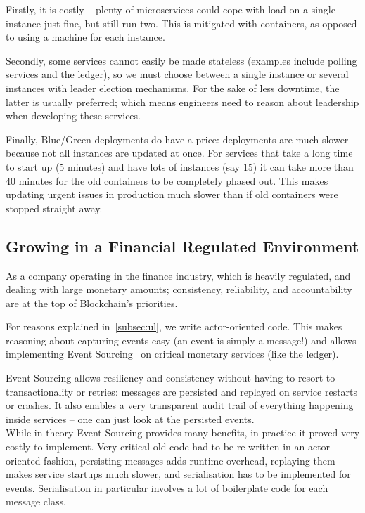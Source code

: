 \documentclass[conference]{IEEEtran}
\begin{document}
    Firstly, it is costly -- plenty of microservices could cope with load on a single instance just
    fine, but still run two.
    This is mitigated with containers, as opposed to using a machine for each
    instance.

    Secondly, some services cannot easily be made stateless (examples include polling services
    and the ledger), so we must choose between a single instance or several instances with leader
    election mechanisms.
    For the sake of less downtime, the latter is usually preferred;
    which means engineers need to reason about leadership when developing these services.

    Finally, Blue/Green deployments do have a price: deployments are much slower because not
    all instances are updated at once.
    For services that take a long time to start up (5 minutes) and have lots of instances (say 15)
    it can take more than 40 minutes for the old containers to be completely phased out.
    This makes updating urgent issues in production much slower than if old containers were stopped
    straight away.

    \subsection{Growing in a Financial Regulated Environment}\label{subsec:regulated}

    As a company operating in the finance industry, which is heavily regulated, and dealing
    with large monetary amounts;
    consistency, reliability, and accountability are at the top of Blockchain's priorities.

    For reasons explained in~\ref{subsec:ul}, we write actor-oriented code.
    This makes reasoning about capturing events easy (an event is simply a message!) and allows
    implementing Event Sourcing~\cite{fowlerES} on critical monetary services (like the ledger).

    Event Sourcing allows resiliency and consistency without having to resort to transactionality
    or retries: messages are persisted and replayed on service restarts or crashes.
    It also enables a very transparent audit trail of everything happening inside services -- one
    can just look at the persisted events.\\

    While in theory Event Sourcing provides many benefits, in practice it proved very costly to
    implement.
    Very critical old code had to be re-written in an actor-oriented fashion, persisting messages
    adds runtime overhead, replaying them makes service startups much slower, and serialisation has
    to be implemented for events.
    Serialisation in particular involves a lot of boilerplate code for each message class.
\end{document}

